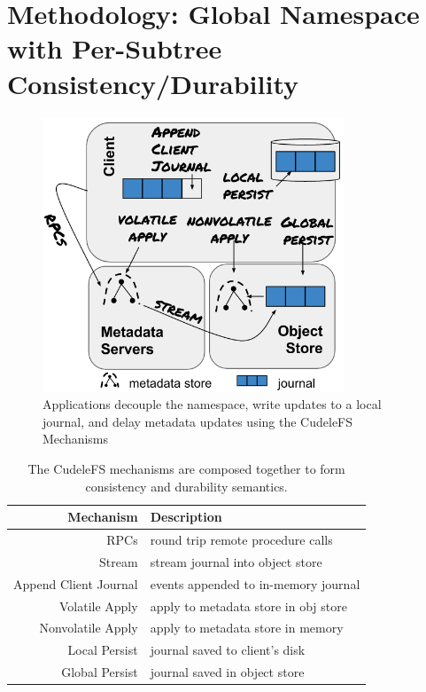 \section{Methodology: Global Namespace with Per-Subtree Consistency/Durability}
\label{sec:methodology-decoupled-namespaces}

\begin{figure}[tb]
\centering
\includegraphics[width=90mm]{figures/fig-decouple.png}
\caption{Applications decouple the namespace, write updates to a local journal,
and delay metadata updates using the CudeleFS Mechanisms }\label{fig:decouple}
\end{figure}

\begin{table}
\begin{tabular}{ r | l }
  Mechanism         & Description \\\hline
  RPCs              & round trip remote procedure calls \\
  Stream            & stream journal into object store \\
  Append Client Journal & events appended to in-memory journal \\
  Volatile Apply    & apply to metadata store in obj store \\
  Nonvolatile Apply & apply to metadata store in memory \\
  Local Persist     & journal saved to client's disk \\
  Global Persist    & journal saved in object store \\
\end{tabular}
\caption{The CudeleFS mechanisms are composed together to form consistency and
durability semantics.\label{table:mechanisms}} 
\end{table}

